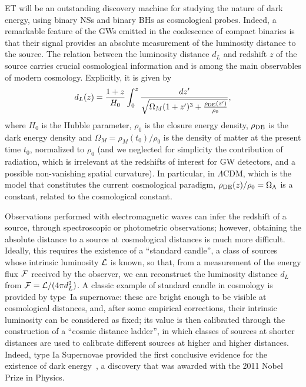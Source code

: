 ET will be an outstanding discovery machine for studying the nature of dark energy, using binary NSs and binary BHs as cosmological probes.
Indeed, a remarkable feature of the GWs emitted in the coalescence of compact binaries is that  their signal   provides an absolute measurement of the luminosity distance to the source. The relation between the luminosity distance $d_L$ and redshift $z$ of the source carries crucial cosmological information and is among the main observables of modern cosmology. Explicitly, it is given by
\begin{equation}\label{eq:dL(z)}
d_L(z)=\frac{1+z}{H_0}\int_0^z \frac{dz'}{\sqrt{\Omega_M(1+z')^3+\frac{\rho_{\rm DE}(z')}{\rho_0}}},
\end{equation}
where $H_0$ is the Hubble parameter, $\rho_0$ is the closure energy density, $\rho_{\rm DE}$ is the dark energy density and $\Omega_M=\rho_M(t_0)/\rho_0$ is  the  density  of matter at the present time $t_0$, normalized to $\rho_0$ (and we neglected for simplicity the contribution of radiation, which is irrelevant at the redshifts of interest for GW detectors, and a possible non-vanishing spatial curvature). In particular, in  $\Lambda$CDM, which is the model that constitutes the  current cosmological paradigm, $\rho_{\rm DE}(z)/\rho_0=\Omega_{\Lambda}$ is a constant, related to the cosmological constant.

Observations performed with electromagnetic waves can  infer the redshift of a source,  through spectroscopic or photometric observations; however, obtaining the absolute distance to a source at cosmological distances is much more difficult. Ideally, this requires the existence of a ``standard candle'', a class of sources whose intrinsic luminosity ${\cal L}$ is known, so that, from a measurement of the  energy flux ${\cal F}$  received by the observer, we can reconstruct the luminosity distance $d_L$ from ${\cal F}={\cal L}/(4\pi d_L^2)$.
A classic example of standard candle in cosmology is provided by type~Ia supernovae: these are bright enough to be visible at cosmological distances, and, after some empirical corrections, their intrinsic luminosity can be considered as fixed; its value is then calibrated through the
 construction of a  ``cosmic distance ladder'', in which classes of sources at shorter distances are used to calibrate different sources at higher and higher distances. Indeed, type Ia Supernovae provided the first conclusive evidence for the  existence of dark energy~\cite{Riess:1998cb,Perlmutter:1998np}, a discovery that was awarded with the 2011 Nobel Prize in Physics.
 
